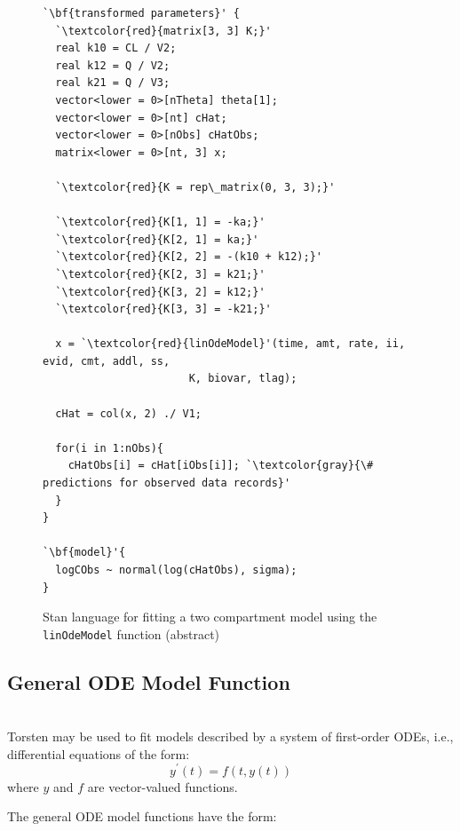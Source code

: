 \documentclass[11pt]{amsart}
\newenvironment{fmpage}[1]
     {\begin{lrbox}{\fmbox}\begin{minipage}{#1}}
     {\end{minipage}\end{lrbox}\fbox{\usebox{\fmbox}}}
\begin{document}
\begin{figure}[!htb]
\caption{Stan language for fitting a two compartment model using the \texttt{linOdeModel} function (abstract)}
\begin{center}
\begin{small}
\begin{fmpage}{\textwidth - .75in}
\begin{lstlisting}[basicstyle=\footnotesize\ttfamily,mathescape=true,flexiblecolumns=true,frame=single,escapeinside=`']
`\bf{transformed parameters}' {
  `\textcolor{red}{matrix[3, 3] K;}'
  real k10 = CL / V2;
  real k12 = Q / V2;
  real k21 = Q / V3;
  vector<lower = 0>[nTheta] theta[1];
  vector<lower = 0>[nt] cHat;
  vector<lower = 0>[nObs] cHatObs;
  matrix<lower = 0>[nt, 3] x;
 
  `\textcolor{red}{K = rep\_matrix(0, 3, 3);}'

  `\textcolor{red}{K[1, 1] = -ka;}'  
  `\textcolor{red}{K[2, 1] = ka;}' 
  `\textcolor{red}{K[2, 2] = -(k10 + k12);}' 
  `\textcolor{red}{K[2, 3] = k21;}' 
  `\textcolor{red}{K[3, 2] = k12;}' 
  `\textcolor{red}{K[3, 3] = -k21;}'

  x = `\textcolor{red}{linOdeModel}'(time, amt, rate, ii, evid, cmt, addl, ss,
                       K, biovar, tlag);

  cHat = col(x, 2) ./ V1;

  for(i in 1:nObs){
    cHatObs[i] = cHat[iObs[i]]; `\textcolor{gray}{\# predictions for observed data records}'
  }
}

`\bf{model}'{
  logCObs ~ normal(log(cHatObs), sigma);
}
\end{lstlisting}
\end{fmpage}
\end{small}
\end{center}
\label{LinTwoCptCode}
\end{figure}

\subsection{General ODE Model Function} \ \\

Torsten may be used to fit models described by a system of first-order ODEs, i.e., differential equations of the form:
$$ y^\prime\left(t\right) = f\left(t, y\left(t\right)\right) $$
where $y$ and $f$ are vector-valued functions.

The general ODE model functions have the form:
\end{document}
